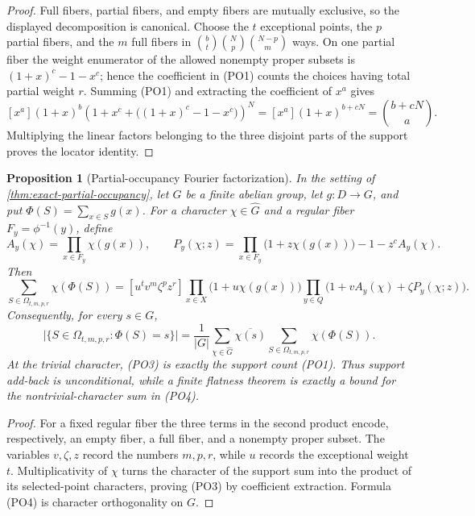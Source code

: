 \documentclass[11pt,a4paper]{amsart}
\numberwithin{equation}{section}
\newtheorem{proposition}[proposition]{Proposition}
\theoremstyle{remark}
\newcommand{\abs}[1]{\lvert #1\rvert}
\begin{document}
\begin{proof}
Full fibers, partial fibers, and empty fibers are mutually exclusive, so
the displayed decomposition is canonical.  Choose the \(t\) exceptional
points, the \(p\) partial fibers, and the \(m\) full fibers in
\(\binom bt\binom Np\binom{N-p}m\) ways.  On one partial fiber the
weight enumerator of the allowed nonempty proper subsets is
\((1+x)^c-1-x^c\); hence the coefficient in \textup{(PO1)} counts the
choices having total partial weight \(r\).  Summing \textup{(PO1)} and
extracting the coefficient of \(x^a\) gives
\[
 [x^a](1+x)^b
 \left(1+x^c+\bigl((1+x)^c-1-x^c\bigr)\right)^N
 =[x^a](1+x)^{b+cN}=\binom{b+cN}{a}.
\]
Multiplying the linear factors belonging to the three disjoint parts of
the support proves the locator identity.
\end{proof}

\begin{proposition}[Partial-occupancy Fourier factorization]
\label{prop:partial-occupancy-fourier}
In the setting of \cref{thm:exact-partial-occupancy}, let \(G\) be a
finite abelian group, let \(g:D\to G\), and put
\(\Phi(S)=\sum_{x\in S}g(x)\).  For a character
\(\chi\in\widehat G\) and a regular fiber \(F_y=\phi^{-1}(y)\), define
\[
 A_y(\chi)=\prod_{x\in F_y}\chi(g(x)),\qquad
 P_y(\chi;z)=
 \prod_{x\in F_y}\bigl(1+z\chi(g(x))\bigr)-1-z^cA_y(\chi).
\]
Then
\[
 \sum_{S\in\Omega_{t,m,p,r}}\chi(\Phi(S))
 =[u^tv^m\zeta^pz^r]
 \prod_{x\in X}\bigl(1+u\chi(g(x))\bigr)
 \prod_{y\in Q}
 \bigl(1+vA_y(\chi)+\zeta P_y(\chi;z)\bigr).          \tag{PO3}
\]
Consequently, for every \(s\in G\),
\[
 \abs{\{S\in\Omega_{t,m,p,r}:\Phi(S)=s\}}
 =\frac1{\abs G}\sum_{\chi\in\widehat G}
   \overline{\chi(s)}
   \sum_{S\in\Omega_{t,m,p,r}}\chi(\Phi(S)).         \tag{PO4}
\]
At the trivial character, \textup{(PO3)} is exactly the support count
\textup{(PO1)}.  Thus support add-back is unconditional, while a finite
flatness theorem is exactly a bound for the nontrivial-character sum in
\textup{(PO4)}.
\end{proposition}

\begin{proof}
For a fixed regular fiber the three terms in the second product encode,
respectively, an empty fiber, a full fiber, and a nonempty proper subset.
The variables \(v,\zeta,z\) record the numbers \(m,p,r\), while \(u\)
records the exceptional weight \(t\).  Multiplicativity of \(\chi\) turns
the character of the support sum into the product of its selected-point
characters, proving \textup{(PO3)} by coefficient extraction.
Formula \textup{(PO4)} is character orthogonality on \(G\).
\end{proof}
\end{document}
